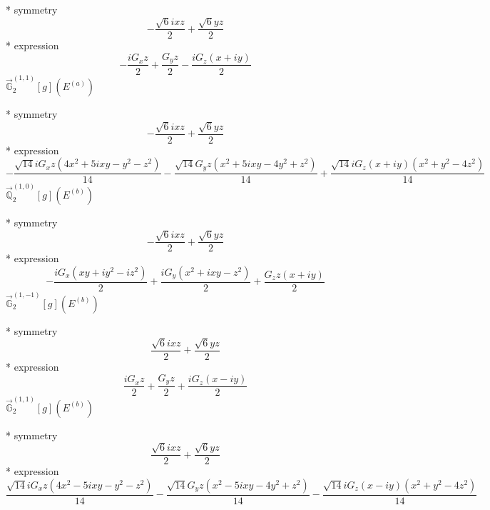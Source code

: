 \documentclass[fleqn,8pt]{jsarticle}
\begin{document}
\noindent\quad ** symmetry
\begin{dmath*}
- \frac{\sqrt{6} i x z}{2} + \frac{\sqrt{6} y z}{2}
\end{dmath*}
\noindent\quad ** expression
\begin{dmath*}
- \frac{i G_{x} z}{2} + \frac{G_{y} z}{2} - \frac{i G_{z} \left(x + i y\right)}{2}
\end{dmath*}
\noindent\quad $\vec{\mathbb{G}}_{2}^{(1,1)}[g](E^{(a)})$

\noindent\quad ** symmetry
\begin{dmath*}
- \frac{\sqrt{6} i x z}{2} + \frac{\sqrt{6} y z}{2}
\end{dmath*}
\noindent\quad ** expression
\begin{dmath*}
- \frac{\sqrt{14} i G_{x} z \left(4 x^{2} + 5 i x y - y^{2} - z^{2}\right)}{14} - \frac{\sqrt{14} G_{y} z \left(x^{2} + 5 i x y - 4 y^{2} + z^{2}\right)}{14} + \frac{\sqrt{14} i G_{z} \left(x + i y\right) \left(x^{2} + y^{2} - 4 z^{2}\right)}{14}
\end{dmath*}
\noindent\quad $\vec{\mathbb{Q}}_{2}^{(1,0)}[g](E^{(b)})$

\noindent\quad ** symmetry
\begin{dmath*}
- \frac{\sqrt{6} i x z}{2} + \frac{\sqrt{6} y z}{2}
\end{dmath*}
\noindent\quad ** expression
\begin{dmath*}
- \frac{i G_{x} \left(x y + i y^{2} - i z^{2}\right)}{2} + \frac{i G_{y} \left(x^{2} + i x y - z^{2}\right)}{2} + \frac{G_{z} z \left(x + i y\right)}{2}
\end{dmath*}
\noindent\quad $\vec{\mathbb{G}}_{2}^{(1,-1)}[g](E^{(b)})$

\noindent\quad ** symmetry
\begin{dmath*}
\frac{\sqrt{6} i x z}{2} + \frac{\sqrt{6} y z}{2}
\end{dmath*}
\noindent\quad ** expression
\begin{dmath*}
\frac{i G_{x} z}{2} + \frac{G_{y} z}{2} + \frac{i G_{z} \left(x - i y\right)}{2}
\end{dmath*}
\noindent\quad $\vec{\mathbb{G}}_{2}^{(1,1)}[g](E^{(b)})$

\noindent\quad ** symmetry
\begin{dmath*}
\frac{\sqrt{6} i x z}{2} + \frac{\sqrt{6} y z}{2}
\end{dmath*}
\noindent\quad ** expression
\begin{dmath*}
\frac{\sqrt{14} i G_{x} z \left(4 x^{2} - 5 i x y - y^{2} - z^{2}\right)}{14} - \frac{\sqrt{14} G_{y} z \left(x^{2} - 5 i x y - 4 y^{2} + z^{2}\right)}{14} - \frac{\sqrt{14} i G_{z} \left(x - i y\right) \left(x^{2} + y^{2} - 4 z^{2}\right)}{14}
\end{dmath*}
\end{document}
